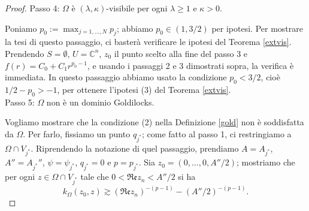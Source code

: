 \begin{proof}
    Passo 4: $\Omega$ è $(\lambda,\kappa)$-visibile per ogni $\lambda\ge 1$ e $\kappa>0$.

    Poniamo $p_0:=\displaystyle\max_{j=1,\dots,N} p_j$; abbiamo $p_0\in(1,3/2)$ per ipotesi. Per mostrare la tesi di questo passaggio, ci basterà verificare le ipotesi del Teorema \ref{extvis}. Prendendo $S=\emptyset$, $U=\mathbb{C}^n$, $z_0$ il punto scelto alla fine del passo 3 e $f(r)=C_0+C_1r^{p_0-1}$, e usando i passaggi 2 e 3 dimostrati sopra, la verifica è immediata. In questo passaggio abbiamo usato la condizione $p_0<3/2$, cioè $1/2-p_0>-1$, per ottenere l'ipotesi (3) del Teorema \ref{extvis}.\\

    Passo 5: $\Omega$ non è un dominio Goldilocks.

    Vogliamo mostrare che la condizione (2) nella Definizione \ref{gold} non è soddisfatta da $\Omega$. Per farlo, fissiamo un punto $q_{j^*}$; come fatto al passo 1, ci restringiamo a $\Omega\cap V_{j^*}$. Riprendendo la notazione di quel passaggio, prendiamo $A=A_{j^*}$, $A''=A_{j^*}''$, $\psi=\psi_{j^*}$, $q_{j^*}=0$ e $p=p_{j^*}$. Sia $z_0=(0,\dots,0,A''/2)$; mostriamo che per ogni $z\in\Omega\cap V_{j^*}$ tale che $0<\mathfrak{Re}z_n<A''/2$ si ha
    \begin{equation}\label{7punto14}
        k_\Omega(z_0,z)\gtrsim(\mathfrak{Re}z_n)^{-(p-1)}-(A''/2)^{-(p-1)}.
    \end{equation}


\end{proof}
